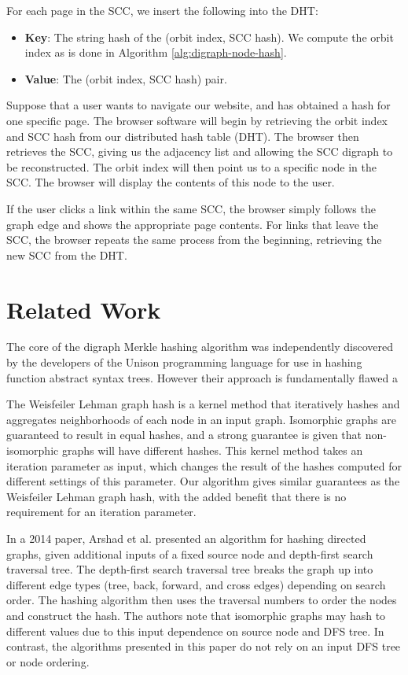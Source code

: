 \documentclass{svproc}
\begin{document}
For each page in the SCC, we insert the following into the DHT:

\begin{itemize}
  \item \textbf{Key}: The string hash of the (orbit index, SCC hash). We compute the orbit index as is done in Algorithm \ref{alg:digraph-node-hash}.
  \item \textbf{Value}: The (orbit index, SCC hash) pair.
\end{itemize}

Suppose that a user wants to navigate our website, and has obtained a hash for one specific page. The browser software will begin by retrieving the orbit index and SCC hash from our distributed hash table (DHT). The browser then retrieves the SCC, giving us the adjacency list and allowing the SCC digraph to be reconstructed. The orbit index will then point us to a specific node in the SCC. The browser will display the contents of this node to the user.

If the user clicks a link within the same SCC, the browser simply follows the graph edge and shows the appropriate page contents. For links that leave the SCC, the browser repeats the same process from the beginning, retrieving the new SCC from the DHT.

\section{Related Work}

The core of the digraph Merkle hashing algorithm was independently discovered by the developers of the Unison programming language for use in hashing function abstract syntax trees. However their approach is fundamentally flawed a



The Weisfeiler Lehman graph hash \cite{Shervashidze2011-dt} is a kernel method that iteratively hashes and aggregates neighborhoods of each node in an input graph. Isomorphic graphs are guaranteed to result in equal hashes, and a strong guarantee is given that non-isomorphic graphs will have different hashes. This kernel method takes an iteration parameter as input, which changes the result of the hashes computed for different settings of this parameter. Our algorithm gives similar guarantees as the Weisfeiler Lehman graph hash, with the added benefit that there is no requirement for an iteration parameter.

In a 2014 paper, Arshad et al. \cite{Arshad2014-cc} presented an algorithm for hashing directed graphs, given additional inputs of a fixed source node and depth-first search traversal tree. The depth-first search traversal tree breaks the graph up into different edge types (tree, back, forward, and cross edges) depending on search order. The hashing algorithm then uses the traversal numbers to order the nodes and construct the hash. The authors note that isomorphic graphs may hash to different values due to this input dependence on source node and DFS tree. In contrast, the algorithms presented in this paper do not rely on an input DFS tree or node ordering.
\end{document}
